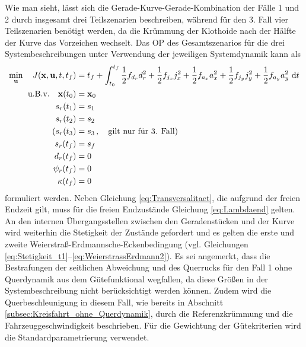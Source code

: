 Wie man sieht, lässt sich die Gerade-Kurve-Gerade-Kombination der Fälle 1 und 2 durch insgesamt drei Teilszenarien beschreiben, während für den 3. Fall vier Teilszenarien benötigt werden, da die Krümmung der Klothoide nach der Hälfte der Kurve das Vorzeichen wechselt. Das \gls{OP} des Gesamtszenarios für die drei Systembeschreibungen unter Verwendung der jeweiligen Systemdynamik kann als
\begin{align}
\min_{\boldsymbol{\mathrm{u}}} \quad J(\boldsymbol{\mathrm{x}},\boldsymbol{\mathrm{u}},t,t_f) &= t_f + \int_{t_0}^{t_f}\frac{1}{2}f_{d_r} d_r^2 + \frac{1}{2}f_{j_x} j_x^2 + \frac{1}{2}f_{a_x} a_x^2 + \frac{1}{2}f_{j_y} j_y^2 + \frac{1}{2}f_{a_y} a_y^2~\textrm{d}{t} \\
\textrm{u.B.v.} \quad \boldsymbol{\mathrm{x}}(t_0) &= \boldsymbol{\mathrm{x}}_0 \\
s_r(t_1) &= s_1 \\
s_r(t_2) &= s_2 \\
(s_r(t_3) &= s_3\,, \quad \textrm{gilt nur für 3. Fall}) \\
s_r(t_f) &= s_f \\
d_r(t_f) &= 0 \\
\psi_r(t_f) &= 0 \\
\kappa(t_f) &= 0
\end{align}
formuliert werden. Neben Gleichung \eqref{eq:Transversalitaet}, die aufgrund der freien Endzeit gilt, muss für die freien Endzustände Gleichung \eqref{eq:Lambdaend} gelten. An den internen Übergangsstellen zwischen den Geradenstücken und der Kurve wird weiterhin die Stetigkeit der Zustände gefordert und es gelten die erste und zweite Weierstraß-Erdmannsche-Eckenbedingung (vgl. Gleichungen \eqref{eq:Stetigkeit_t1}--\eqref{eq:WeierstrassErdmann2}). Es sei angemerkt, dass die Bestrafungen der seitlichen Abweichung und des Querrucks für den Fall 1 ohne Querdynamik aus dem Gütefunktional wegfallen, da diese Größen in der Systembeschreibung nicht berücksichtigt werden können. Zudem wird die Querbeschleunigung in diesem Fall, wie bereits in Abschnitt \ref{subsec:Kreisfahrt_ohne_Querdynamik}, durch die Referenzkrümmung und die Fahrzeuggeschwindigkeit beschrieben. Für die Gewichtung der Gütekriterien wird die Standardparametrierung verwendet.
